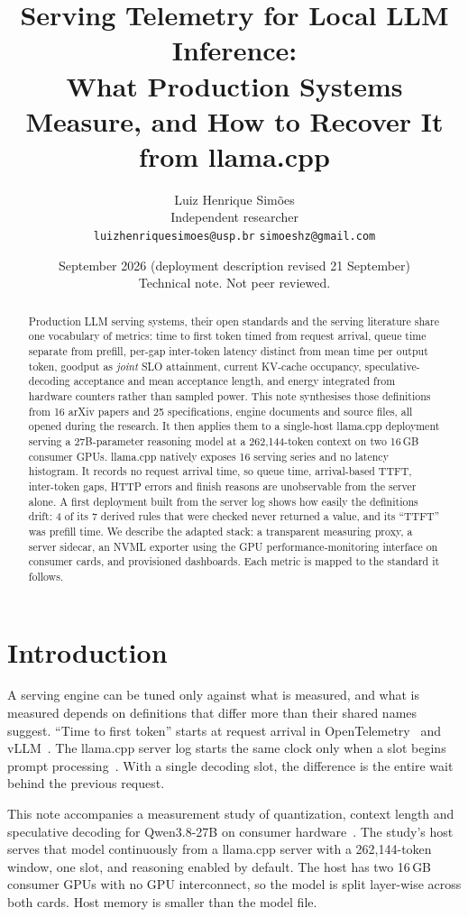 \documentclass[11pt]{article}
\title{Serving Telemetry for Local LLM Inference:\\
What Production Systems Measure, and How to Recover It from llama.cpp}
\author{Luiz Henrique Sim\~oes\\ \small Independent researcher \\ \small\texttt{luizhenriquesimoes@usp.br} \textperiodcentered{} \texttt{simoeshz@gmail.com}}
\date{September 2026 (deployment description revised 21 September) \\ \small Technical note. Not peer reviewed.}
\begin{document}
\maketitle

\begin{abstract}
Production LLM serving systems, their open standards and the serving literature share one
vocabulary of metrics: time to first token timed from request arrival, queue time separate from
prefill, per-gap inter-token latency distinct from mean time per output token, goodput as
\emph{joint} SLO attainment, current KV-cache occupancy, speculative-decoding acceptance and mean
acceptance length, and energy integrated from hardware counters rather than sampled power. This note
synthesises those definitions from 16 arXiv papers and 25 specifications, engine documents and
source files, all opened during the research. It then applies them to a single-host llama.cpp
deployment serving a 27B-parameter reasoning model at a 262,144-token context on two 16\,GB consumer
GPUs. llama.cpp natively exposes 16 serving series and no latency histogram. It records no request
arrival time, so queue time, arrival-based TTFT, inter-token gaps, HTTP errors and finish reasons are
unobservable from the server alone. A first deployment built from the server log shows how easily
the definitions drift: 4 of its 7 derived rules that were checked never returned a value, and its
``TTFT'' was prefill time. We describe the adapted stack: a transparent measuring proxy, a server
sidecar, an NVML exporter using the GPU performance-monitoring interface on consumer cards, and
provisioned dashboards. Each metric is mapped to the standard it follows.
\end{abstract}

\section{Introduction}

A serving engine can be tuned only against what is measured, and what is measured depends on
definitions that differ more than their shared names suggest. ``Time to first token'' starts at
request arrival in OpenTelemetry~\citep{otel_genai_metrics} and vLLM~\citep{vllm_metrics}. The
llama.cpp server log starts the same clock only when a slot begins prompt
processing~\citep{llamacpp_server}. With a single decoding slot, the difference is the entire wait
behind the previous request.

This note accompanies a measurement study of quantization, context length and speculative decoding
for Qwen3.8-27B on consumer hardware~\citep{simoes2026benchmarks}. The study's host serves that model
continuously from a llama.cpp server with a 262,144-token window, one slot, and reasoning enabled by
default. The host has two 16\,GB consumer GPUs with no GPU interconnect, so the model is split
layer-wise across both cards. Host memory is smaller than the model file.
\end{document}

